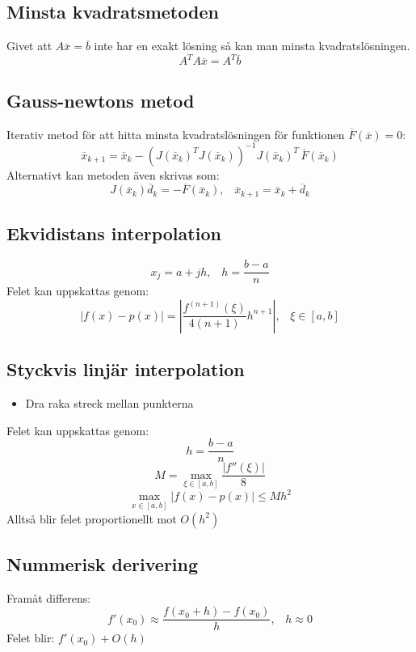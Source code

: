 \documentclass[a4paper,11pt]{article}
\begin{document}
\subsection{Minsta kvadratsmetoden}
Givet att $A\overline{x} = \overline{b}$ inte har en exakt lösning så kan man minsta kvadratslösningen.
\[
A^T A \overline{x} = A^T \overline{b}
\]

\subsection{Gauss-newtons metod}
Iterativ metod för att hitta minsta kvadratslösningen för funktionen $\overline{F}(\overline{x}) = 0$:
\[
\overline{x}_{k+1} = \overline{x}_k - (J(\overline{x}_k)^T J(\overline{x}_k))^{-1} J(\overline{x}_k)^T \hspace{2pt} \overline{F}(\overline{x}_k)
\]
Alternativt kan metoden även skrivas som:
\[
J(\overline{x}_k)\overline{d}_k = -\overline{F}(\overline{x}_k), \hspace{10pt} \overline{x}_{k+1} = \overline{x}_k + \overline{d}_k
\]

\subsection{Ekvidistans interpolation}
\[
x_j = a + jh, \hspace{10pt} h = \frac{b-a}{n}
\]
Felet kan uppskattas genom:
\[
|f(x) - p(x)| = |\frac{f^{(n+1)}(\xi)}{4(n+1)}h^{n+1}|, \hspace{10pt} \xi \in [a, b]
\]

\subsection{Styckvis linjär interpolation}
\begin{itemize}
    \item Dra raka streck mellan punkterna
\end{itemize}
Felet kan uppskattas genom:
\[
h = \frac{b - a}{n}
\]
\[
M = \max_{\xi \in [a, b]} \frac{|f''(\xi)|}{8}
\]
\[
\max_{x \in [a, b]} |f(x) - p(x)| \leq Mh^2
\]
Alltså blir felet proportionellt mot $O(h^2)$

\subsection{Nummerisk derivering}
Framåt differens:
\[
f'(x_0) \approx \frac{f(x_0 + h) - f(x_0)}{h}, \hspace{10pt} h \approx 0
\]
Felet blir: $f'(x_0) + O(h)$
\end{document}
